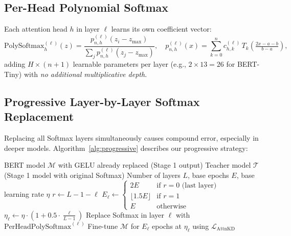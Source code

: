 \documentclass[12pt, a4paper]{article}
\begin{document}
\subsection{Per-Head Polynomial Softmax}

Each attention head $h$ in layer $\ell$ learns its own coefficient vector:
\begin{equation}
  \text{PolySoftmax}^{(\ell)}_h(z) = \frac{p^{(\ell)}_{n,h}(z_i - z_{\max})}{\sum_j p^{(\ell)}_{n,h}(z_j - z_{\max})}, \quad
  p^{(\ell)}_{n,h}(x) = \sum_{k=0}^{n} c^{(\ell)}_{h,k}\, T_k\!\left(\tfrac{2x - a - b}{b-a}\right),
  \label{eq:perhead}
\end{equation}
adding $H \times (n+1)$ learnable parameters per layer (e.g., $2 \times 13 = 26$ for BERT-Tiny) with \emph{no additional multiplicative depth}.

\subsection{Progressive Layer-by-Layer Softmax Replacement}

Replacing all Softmax layers simultaneously causes compound error, especially in deeper models. Algorithm~\ref{alg:progressive} describes our progressive strategy:

\begin{algorithm}[ht]
\caption{Progressive Softmax Replacement with Attention KD}
\label{alg:progressive}
\begin{algorithmic}[1]
\Require BERT model $\mathcal{M}$ with GELU already replaced (Stage 1 output)
\Require Teacher model $\mathcal{T}$ (Stage 1 model with original Softmax)
\Require Number of layers $L$, base epochs $E$, base learning rate $\eta$
    \State $r \gets L - 1 - \ell$ 
    \State $E_\ell \gets \begin{cases} 2E & \text{if } r = 0 \text{ (last layer)} \\ \lfloor 1.5E \rfloor & \text{if } r = 1 \\ E & \text{otherwise} \end{cases}$ 
    \State $\eta_\ell \gets \eta \cdot \left(1 + 0.5 \cdot \frac{\ell}{L-1}\right)$ 
    \State Replace Softmax in layer $\ell$ with $\text{PerHeadPolySoftmax}^{(\ell)}$
    \State Fine-tune $\mathcal{M}$ for $E_\ell$ epochs at $\eta_\ell$ using $\mathcal{L}_{\text{AttnKD}}$
\EndFor
\end{algorithmic}
\end{algorithm}
\end{document}
